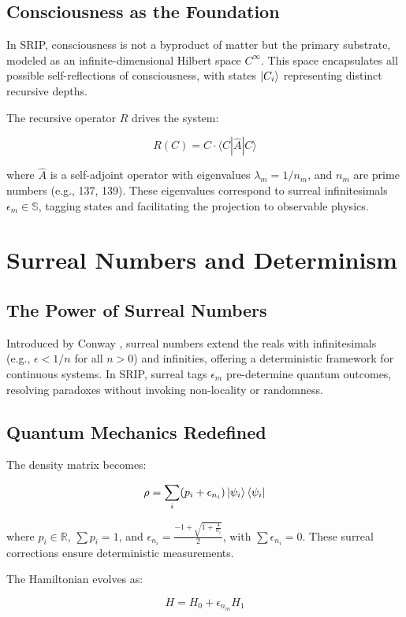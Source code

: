 \documentclass[12pt]{article}
\begin{document}
\subsection{Consciousness as the Foundation}
In SRIP, consciousness is not a byproduct of matter but the primary substrate, modeled as an infinite-dimensional Hilbert space \(C^\infty\). This space encapsulates all possible self-reflections of consciousness, with states \(\ket{C_i}\) representing distinct recursive depths.

The recursive operator \(R\) drives the system:

\[
R(C) = C \cdot \langle C | \hat{A} | C \rangle
\]

where \(\hat{A}\) is a self-adjoint operator with eigenvalues \(\lambda_m = 1 / n_m\), and \(n_m\) are prime numbers (e.g., 137, 139). These eigenvalues correspond to surreal infinitesimals \(\epsilon_m \in \mathbb{S}\), tagging states and facilitating the projection to observable physics.

\section{Surreal Numbers and Determinism}
\subsection{The Power of Surreal Numbers}
Introduced by Conway \cite{Conway1976}, surreal numbers extend the reals with infinitesimals (e.g., \(\epsilon < 1/n\) for all \(n > 0\)) and infinities, offering a deterministic framework for continuous systems. In SRIP, surreal tags \(\epsilon_m\) pre-determine quantum outcomes, resolving paradoxes without invoking non-locality or randomness.

\subsection{Quantum Mechanics Redefined}
The density matrix becomes:

\[
\rho = \sum_i (p_i + \epsilon_{n_i}) \ket{\psi_i} \bra{\psi_i}
\]

where \(p_i \in \mathbb{R}\), \(\sum p_i = 1\), and \(\epsilon_{n_i} = \frac{-1 + \sqrt{1 + \frac{4}{n_i}}}{2}\), with \(\sum \epsilon_{n_i} = 0\). These surreal corrections ensure deterministic measurements.

The Hamiltonian evolves as:

\[
H = H_0 + \epsilon_{n_m} H_1
\]
\end{document}
